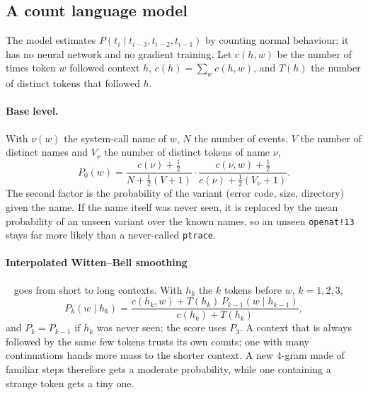 \subsection{A count language model}\label{sec:model}

The model estimates $P(t_i\mid t_{i-3},t_{i-2},t_{i-1})$ by counting normal behaviour; it has no neural network and no
gradient training. Let $c(h,w)$ be the number of times token $w$ followed context $h$, $c(h)=\sum_w c(h,w)$, and $T(h)$
the number of distinct tokens that followed $h$.

\paragraph{Base level.} With $\nu(w)$ the system-call name of $w$, $N$ the number of events, $V$ the number of distinct
names and $V_\nu$ the number of distinct tokens of name $\nu$,
\begin{equation}
P_0(w)=\frac{c(\nu)+\frac12}{N+\frac12(V+1)}\cdot\frac{c(\nu,w)+\frac12}{c(\nu)+\frac12(V_\nu+1)} .
\end{equation}
The second factor is the probability of the variant (error code, size, directory) given the name. If the name itself
was never seen, it is replaced by the mean probability of an unseen variant over the known names, so an unseen
\texttt{openat!13} stays far more likely than a never-called \texttt{ptrace}.

\paragraph{Interpolated Witten--Bell smoothing}~\cite{witten1991,chen1999} goes from short to long contexts. With $h_k$
the $k$ tokens before $w$, $k=1,2,3$,
\begin{equation}
P_k(w\mid h_k)=\frac{c(h_k,w)+T(h_k)\,P_{k-1}(w\mid h_{k-1})}{c(h_k)+T(h_k)},
\end{equation}
and $P_k=P_{k-1}$ if $h_k$ was never seen; the score uses $P_3$. A context that is always followed by the same few
tokens trusts its own counts; one with many continuations hands more mass to the shorter context. A new 4-gram made of
familiar steps therefore gets a moderate probability, while one containing a strange token gets a tiny one.

